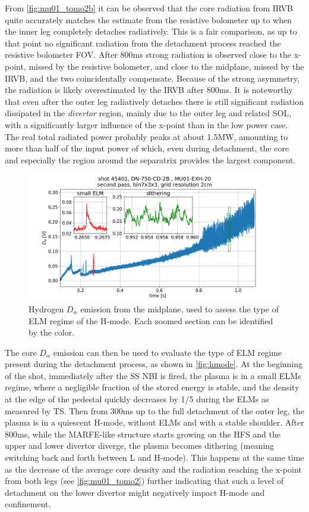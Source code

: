 From \autoref{fig:mu01_tomo2b} it can be observed that the core radiation from IRVB quite accurately matches the estimate from the resistive bolometer up to when the inner leg completely detaches radiatively. This is a fair comparison, as up to that point no significant radiation from the detachment process reached the resistive bolometer FOV. After 800ms strong radiation is observed close to the x-point, missed by the resistive bolometer, and close to the midplane, missed by the IRVB, and the two coincidentally compensate. Because of the strong asymmetry, the radiation is likely overestimated by the IRVB after 800ms. It is noteworthy that even after the outer leg radiatively detaches there is still significant radiation dissipated in the \emph{divertor} region, mainly due to the outer leg and related SOL, with a significantly larger influence of the x-point than in the low power case. The real total radiated power probably peaks at about 1.5MW, amounting to more than half of the input power of which, even during detachment, the core and especially the region around the separatrix provides the largest component.

\begin{figure}[!ht]
	\centering
	\includegraphics[trim={40 0 80 50},clip,width=0.8\linewidth]{Chapters/chapter2/figs/IRVB-MASTU_shot-45401_pass1_bin7x3x3_gridres2cm_all_variables_absolute_small4.png}
	\caption{Hydrogen $D_{\alpha}$ emission from the midplane, used to assess the type of ELM regime of the H-mode. Each zoomed section can be identified by the color.}
	\label{fig:hmode}
\end{figure}

The core $D_{\alpha}$ emission can then be used to evaluate the type of ELM regime present during the detachment process, as shown in \autoref{fig:hmode}. At the beginning of the shot, immediately after the SS NBI is fired, the plasma is in a small ELMs regime, where a negligible fraction of the stored energy is stable, and the density at the edge of the pedestal quickly decreases by 1/5 during the ELMs as measured by TS. Then from 300ms up to the full detachment of the outer leg, the plasma is in a quiescent H-mode, without ELMs and with a stable shoulder. After 800ms, while the MARFE-like structure starts growing on the HFS and the upper and lower divertor diverge, the plasma becomes dithering (meaning switching back and forth between L and H-mode). This happens at the same time as the decrease of the average core density and the radiation reaching the x-point from both legs (see \autoref{fig:mu01_tomo2}) further indicating that such a level of detachment on the lower divertor might negatively impact H-mode and confinement.

